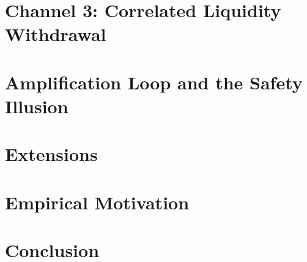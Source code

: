 \documentclass[12pt]{article}
\theoremstyle{remark}
\begin{document}
\section{Channel 3: Correlated Liquidity Withdrawal}


\section{Amplification Loop and the Safety Illusion}


\section{Extensions}


\section{Empirical Motivation}


\section{Conclusion}





\appendix

\end{document}
